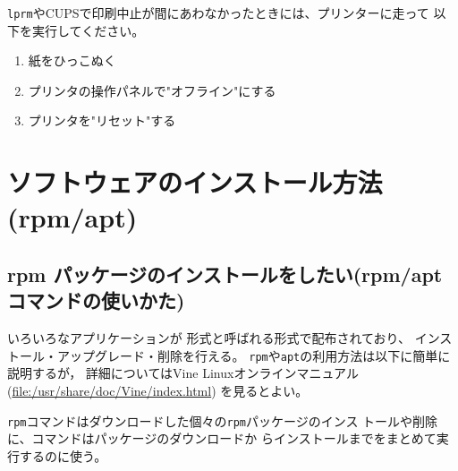 \documentclass{jreport}
\begin{document}
\verb|lprm|やCUPSで印刷中止が間にあわなかったときには、プリンターに走って
以下を実行してください。
\begin{enumerate}
\item 紙をひっこぬく 
\item プリンタの操作パネルで"オフライン"にする 
\item プリンタを"リセット"する 
\end{enumerate}


\chapter{ソフトウェアのインストール方法(rpm/apt)}


\section{rpm パッケージのインストールをしたい(rpm/apt コマンドの使いかた)}

いろいろなアプリケーションが  形式と呼ばれる形式で配布されており、
インストール・アップグレード・削除を行える。
\verb|rpm|や\verb|apt|の利用方法は以下に簡単に説明するが，
詳細についてはVine Linuxオンラインマニュアル
(\url{file:/usr/share/doc/Vine/index.html})
を見るとよい。

\verb|rpm|コマンドはダウンロードした個々の\verb|rpm|パッケージのインス
トールや削除に、コマンドはパッケージのダウンロードか
らインストールまでをまとめて実行するのに使う。
\end{document}
